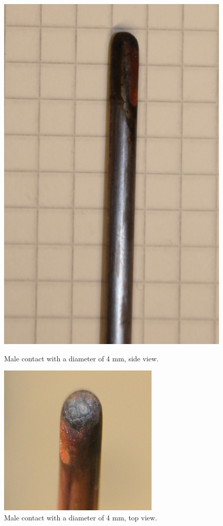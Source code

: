 \documentclass[10pt,a4paper]{article} %
\begin{document}
\begin{figure}[H]
\centering
\begin{minipage}{.5\textwidth}
  \centering
  \includegraphics[scale=0.2]{Bilder/Discussion/d4_630and400_burn.png}
  \caption{Male contact with a diameter of 4 mm, \newline side view.}
  \label{fig:d4_burn_side}
\end{minipage}%
\begin{minipage}{.5\textwidth}
  \centering
  \includegraphics[scale=0.53]{Bilder/Discussion/d4_630and400_top_burn.png}
  \caption{Male contact with a diameter of 4 mm, \newline top view.}
  \label{fig:d4_burn_top}
\end{minipage}
\end{figure}
\end{document}
